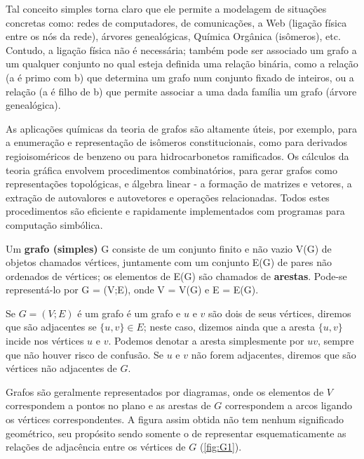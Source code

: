 Tal conceito simples torna claro que ele permite a modelagem de situações concretas como: redes de computadores, de comunicações, a Web (ligação física entre
os nós da rede), árvores genealógicas, Química Orgânica (isômeros), etc.
Contudo, a ligação física não é necessária; também pode ser associado um grafo
a um qualquer conjunto no qual esteja definida uma relação binária, como a relação
(a é primo com b) que determina um grafo num conjunto fixado de inteiros, ou a
relação (a é filho de b) que permite associar a uma dada família um grafo (árvore
genealógica).


As aplicações químicas da teoria de grafos são altamente úteis, por exemplo, para a enumeração e representação de isômeros constitucionais, como para derivados regioisoméricos de benzeno ou para hidrocarbonetos ramificados. Os cálculos da teoria gráfica envolvem procedimentos combinatórios, para gerar grafos como representações topológicas, e álgebra linear - a formação de matrizes e vetores, a extração de autovalores e  autovetores e operações relacionadas. Todos estes procedimentos são eficiente e rapidamente implementados com programas para computação simbólica\autocite{allinger2010molecular}.

\begin{definition}
Um \textbf{grafo (simples)} G consiste de um conjunto finito e não vazio
V(G) de objetos chamados vértices, juntamente com um conjunto E(G) de pares
não ordenados de vértices; os elementos de E(G) são chamados de \textbf{arestas}. Pode-se representá-lo por G = (V;E), onde V = V(G) e E = E(G).
\end{definition}

Se $G = (V;E)$ é um grafo é um grafo e $u$ e $v$ são dois de seus vértices, diremos que são adjacentes se $\{u,v\} \in E$; neste caso, dizemos ainda que a aresta $\{u,v\}$ incide nos vértices $u$ e $v$. Podemos denotar a aresta simplesmente por $uv$, sempre que não houver risco de confusão. Se $u$ e $v$ não forem adjacentes, diremos que são vértices não adjacentes de $G$.

Grafos são geralmente representados por diagramas, onde os elementos de $V$ correspondem a pontos no plano e as arestas de $G$ correspondem a arcos ligando os vértices correspondentes. A figura assim obtida não tem nenhum significado geométrico, seu propósito sendo somente o de representar esquematicamente as relações de adjacência entre os vértices de $G$ (\autoref{fig:G1}).

